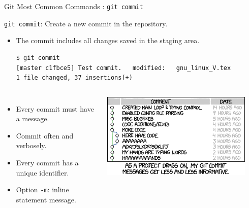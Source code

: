 \begin{frame}[t,fragile]{Git Most Common Commands : \alert{\texttt{git commit}}}
  \begin{block}{\alert{\texttt{git commit}}: Create a new commit in the repository. }
      \begin{itemize}
      \item  {\footnotesize The commit includes all changes saved in the \alert{staging area}.}
      \begin{lstlisting}
$ git commit 
[master c1fbce5] Test commit. 	modified:   gnu_linux_V.tex
1 file changed, 37 insertions(+)
      \end{lstlisting}
      \end{itemize}

  \begin{columns}
      \begin{itemize}
  \item  {\scriptsize Every commit \alert{must} have a message.
      }
  \item  {\scriptsize Commit often and verbosely.
      }
  \item  {\scriptsize Every commit has a unique identifier.
      }
  \item  {\scriptsize Option \texttt{-m}: inline statement message. 
      }
      \end{itemize}
    \begin{center}
      \includegraphics[angle=0,width=0.9\textwidth]{./Figs/git_commit.png}
    \end{center}
  \end{columns}
  
\end{block}  
  
\end{frame}
